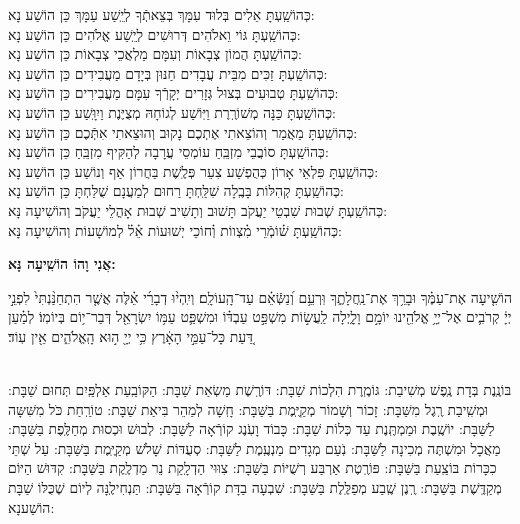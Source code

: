 \documentclass[twoside, openany, parskip=half, 11pt]{book}
\begin{document}
\begin{small}
 כְּהוֹשַֽׁעְתָּ אֵלִים בְּלוּד עִמָּךְ בְּצֵאתְֿךָ לְיֵֽשַׁע עַמָּךְ 	\hfill	כֵּן הוֹשַׁע נָא: \\
כְּהוֹשַֽׁעְתָּ גּוֹי וֵאלֹהִים דְּרוּשִׁים לְיֵֽשַׁע אֱלֹהִים 		\hfill	כֵּן הוֹשַׁע נָא: \\
כְּהוֹשַֽׁעְתָּ הֲמוֹן צְבָאוֹת וְעִמָּם מַלְאֲכֵי צְבָאוֹת 		\hfill	כֵּן הוֹשַׁע נָא: \\
כְּהוֹשַֽׁעְתָּ זַכִּים מִבֵּית עֲבָדִים חַנּוּן בְּיָדָם מַעֲבִידִים 	\hfill	כֵּן הוֹשַׁע נָא: \\
כְּהוֹשַֽׁעְתָּ טְבוּעִים בְּצוּל גְּזָרִים יְקָרְֿךָ עִמָּם מַעֲבִירִים 	\hfill	כֵּן הוֹשַׁע נָא: \\
כְּהוֹשַֽׁעְתָּ כַּנָּה מְשׁוֹרֶֽרֶת וַיּֽוֹשַׁע לְגוֹחָהּ מְצֻיֶּנֶת וַיִוָּֽשַׁע 	\hfill	כֵּן הוֹשַׁע נָא: \\
כְּהוֹשַֽׁעְתָּ מַאֲמַר וְהוֹצֵאתִי אֶתְכֶם נָקוּב וְהוּצֵאתִי אִתְּֿכֶם \hfill	כֵּן הוֹשַׁע נָא:\\
כְּהוֹשַֽׁעְתָּ סוֹבֲבֵי מִזְבֵּֽחַ עוֹמְסֵי עֲרָבָה לְהַקִּיף מִזְבֵּֽחַ 	\hfill	 כֵּן הוֹשַׁע נָא: \\
כְּהוֹשַֽׁעְתָּ פִּלְאֵי אָרוֹן כְּהֻפְשַׁע צִעֵר פְּלֶֽשֶׁת בַּחֲרוֹן אַף וְנוֹשַׁע \hfill 	 כֵּן הוֹשַׁע נָא:\\
כְּהוֹשַֽׁעְתָּ קְהִלּוֹת בָּבֶֽלָה שִׁלַּֽחְתָּ רַחוּם לְמַעֲנָם שֻׁלַּחְתָּ 	\hfill	 כֵּן הוֹשַׁע נָא:\\

כְּהוֹשַֽׁעְתָּ שְׁבוּת שִׁבְטֵי יַעֲקֹב תָּשׁוּב וְתָשִׁיב שְׁבוּת אָהֳלֵי יַעֲקֹב \hfill וְהוֹשִׁיעָה נָּא:\\
 כְּהוֹשַֽׁעְתָּ שׁ֗וֹמְֿרֵי מִ֗צְווֹת וְ֗חוֹכֵי יְשׁוּעוֹת אֵ֗ל֗ לְמוֹשָׁעוֹת \hfill וְהוֹשִׁיעָה נָּא:

\end{small}

\begin{large}
\textbf{אֲנִי וָהוֹ הוֹשִֽׁיעָה נָּא:}
\end{large}

הוֹשִׁ֤יעָה
 אֶת־עַמֶּ֗ךָ וּבָרֵ֥ךְ אֶת־נַֽחֲלָתֶ֑ךָ וּֽרְעֵ֥ם וְ֝נַשְּֿׂאֵ֗ם עַד־הָֽעוֹלָֽם׃ וְיִֽהְי֨וּ דְבָרַ֜י
  אֵ֗לֶּה אֲשֶׁ֤ר הִתְחַנַּ֨נְתִּי֙ לִפְנֵ֣י יְיָ֔ קְרֹבִ֛ים אֶל־יְיָ֥ אֱלֹהֵ֖ינוּ יוֹמָ֣ם וָלָ֑יְלָה לַֽעֲשׂ֣וֹת מִשְׁפַּ֣ט עַבְדּ֗וֹ וּמִשְׁפַּ֛ט עַמּ֥וֹ יִשְׂרָאֵ֖ל דְּבַר־י֥וֹם בְּיוֹמֽוֹ׃ לְמַ֗עַן דַּ֚עַת כָּל־עַמֵּ֣י הָאָ֔רֶץ כִּ֥י יְיָ֖ ה֣וּא הָֽאֱלֹהִ֑ים אֵ֖ין עֽוֹד׃

\sepline

\\
 בּוֹנֶֽנֶת בְּדָת נֶֽפֶשׁ מְשִׁיבַת: גּוֹמֶֽרֶת הִלְכוֹת שַׁבָּת: דּוֹרֶֽשֶׁת מַשְׂאַת שַׁבָּת: הַקּוֹבַֽעַת אַלְפַּֽיִם תְּחוּם שַׁבָּת: וּמְשִֽׁיבַת רֶֽגֶל מִשַּׁבָּת: זָכוֹר וְשָׁמוֹר מְקַיֶּֽמֶת בַּשַּׁבָּת: חָֽשָׁה לְמַהֵר בִּיאַת שַׁבָּת: טוֹרַֽחַת כֹּל מִשִּׁשָּה לַשַּׁבָּת: יוֹשֶֽׁבֶת וּמַמְתֶּֽנֶת עַד כְּלוֹת שַׁבָּת: כָּבוֹד וָעֹֽנֶג קוֹרְֿאָה לַשַּׁבָּת: לְבוּשׁ וּכְסוּת מְחַלֶּֽפֶת בַּשַּׁבָּת: מַאֲכָל וּמִשְׁתֶּה מְכִינָה לַשַּׁבָּת: נֹֽעַם מְגָדִים מַנְעֶֽמֶת לַשַּׁבָּת: סְעֻדּוֹת שָׁלֹשׁ מְקַיֶּֽמֶת בַּשַּׁבָּת: עַל שְׁתֵּי כִכָּרוֹת בּוֹצַֽעַת בַּשַּׁבָּת: פּוֹרֶֽטֶת אַרְבַּע רְשֻׁיּוֹת בַּשַּׁבָּת: צִוּוּי הַדְלָֽקַת נֵר מַדְלֶֽקֶת בַּשַּׁבָּת: קִדּוּשׁ הַיּוֹם מְקַדֶּֽשֶׁת בַּשַּׁבָּת: רֶֽנֶן שֶֽׁבַע מְפַלֶּֽלֶת בַּשַּׁבָּת: שִׁבְעָה בַדָּת קוֹרְֿאָה בַּשַּׁבָּת: תַּנְחִילֶֽנָּה לְיוֹם שֶׁכֻּלּוֹ שַׁבָּת הוֹשַׁענָא:
\end{document}
